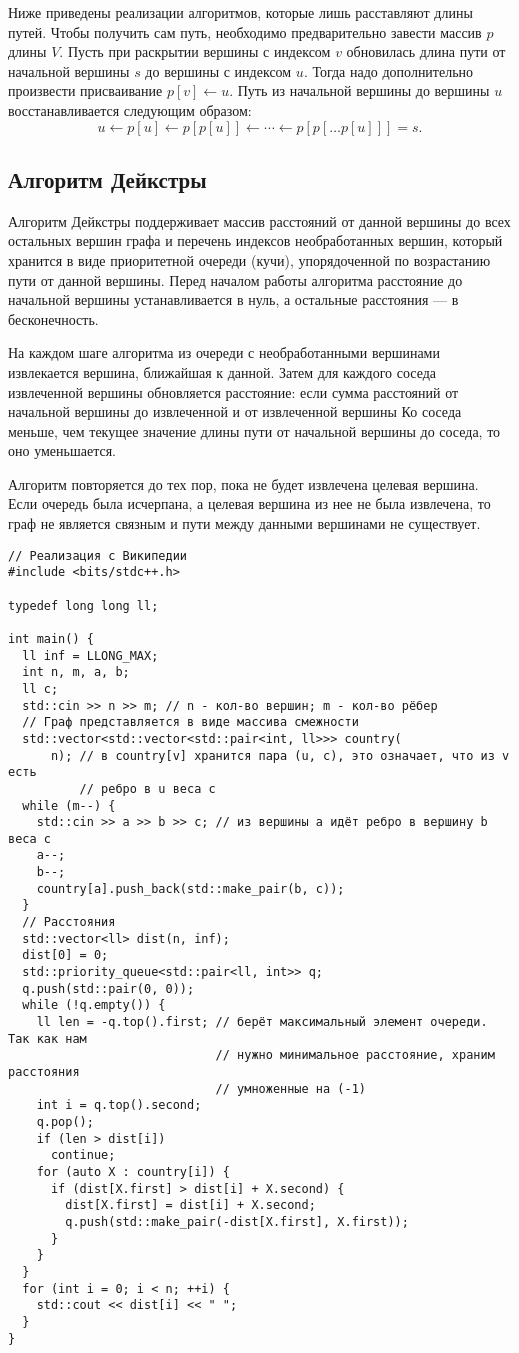 Ниже приведены
реализации алгоритмов, которые лишь расставляют длины путей.
Чтобы получить сам путь, необходимо предварительно завести массив $p$ длины $V$.
Пусть при раскрытии вершины с индексом $v$ обновилась длина пути от начальной вершины $s$ до вершины
с индексом $u$. Тогда надо дополнительно произвести присваивание $p[v] \gets u$.
Путь из начальной вершины до вершины $u$ восстанавливается следующим образом:
$$u \gets p[u] \gets p[p[u]] \gets \cdots \gets p[p[\dots p[u]]] = s. $$

\subsection{Алгоритм Дейкстры}
Алгоритм Дейкстры поддерживает массив расстояний от данной вершины до всех
остальных вершин графа и перечень индексов необработанных вершин, который хранится в
виде приоритетной очереди (кучи), упорядоченной по возрастанию пути от данной вершины.
Перед началом работы алгоритма расстояние до начальной вершины устанавливается в нуль,
а остальные расстояния --- в бесконечность.

На каждом шаге алгоритма из очереди с необработанными вершинами извлекается
вершина, ближайшая к данной. Затем для каждого соседа извлеченной вершины
обновляется расстояние: если сумма расстояний от начальной вершины до извлеченной
и от извлеченной вершины Ко соседа меньше, чем текущее значение длины пути от начальной
вершины до соседа, то оно уменьшается.

Алгоритм повторяется до тех пор, пока не будет извлечена целевая вершина.
Если очередь была исчерпана, а целевая вершина из нее не была извлечена, то
граф не является связным и пути между данными вершинами не существует.

\begin{verbatim}
// Реализация с Википедии
#include <bits/stdc++.h>

typedef long long ll;

int main() {
  ll inf = LLONG_MAX;
  int n, m, a, b;
  ll c;
  std::cin >> n >> m; // n - кол-во вершин; m - кол-во рёбер
  // Граф представляется в виде массива смежности
  std::vector<std::vector<std::pair<int, ll>>> country(
      n); // в country[v] хранится пара (u, c), это означает, что из v есть
          // ребро в u веса c
  while (m--) {
    std::cin >> a >> b >> c; // из вершины a идёт ребро в вершину b веса c
    a--;
    b--;
    country[a].push_back(std::make_pair(b, c));
  }
  // Расстояния
  std::vector<ll> dist(n, inf);
  dist[0] = 0;
  std::priority_queue<std::pair<ll, int>> q;
  q.push(std::pair(0, 0));
  while (!q.empty()) {
    ll len = -q.top().first; // берёт максимальный элемент очереди. Так как нам
                             // нужно минимальное расстояние, храним расстояния
                             // умноженные на (-1)
    int i = q.top().second;
    q.pop();
    if (len > dist[i])
      continue;
    for (auto X : country[i]) {
      if (dist[X.first] > dist[i] + X.second) {
        dist[X.first] = dist[i] + X.second;
        q.push(std::make_pair(-dist[X.first], X.first));
      }
    }
  }
  for (int i = 0; i < n; ++i) {
    std::cout << dist[i] << " ";
  }
}
\end{verbatim}

